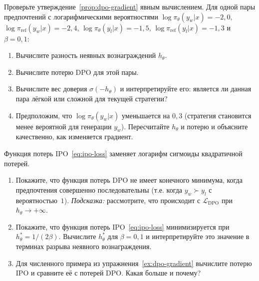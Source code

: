 \begin{exercise}
\label{ex:dpo-gradient}
Проверьте утверждение~\ref{prop:dpo-gradient} явным вычислением. Для одной пары предпочтений с логарифмическими вероятностями $\log\pi_\theta(y_w|x) = -2{,}0$, $\log\pi_\mathrm{ref}(y_w|x) = -2{,}4$, $\log\pi_\theta(y_l|x) = -1{,}5$, $\log\pi_\mathrm{ref}(y_l|x) = -1{,}3$ и $\beta = 0{,}1$:
\begin{enumerate}
  \item Вычислите разность неявных вознаграждений $h_\theta$.
  \item Вычислите потерю DPO для этой пары.
  \item Вычислите вес доверия $\sigma(-h_\theta)$ и интерпретируйте его: является ли данная пара лёгкой или сложной для текущей стратегии?
  \item Предположим, что $\log\pi_\theta(y_w|x)$ уменьшается на $0{,}3$ (стратегия становится менее вероятной для генерации $y_w$). Пересчитайте $h_\theta$ и потерю и объясните качественно, как изменяется градиент.
\end{enumerate}
\end{exercise}

\begin{exercise}
\label{ex:ipo-vs-dpo}
Функция потерь IPO~\eqref{eq:ipo-loss} заменяет логарифм сигмоиды квадратичной потерей.
\begin{enumerate}
  \item Покажите, что функция потерь DPO не имеет конечного минимума, когда предпочтения совершенно последовательны (т.е. когда $y_w \succ y_l$ с вероятностью~$1$). \emph{Подсказка:} рассмотрите, что происходит с $\mathcal{L}_\mathrm{DPO}$ при $h_\theta \to +\infty$.
  \item Покажите, что функция потерь IPO~\eqref{eq:ipo-loss} минимизируется при $h_\theta^* = 1/(2\beta)$. Вычислите $h_\theta^*$ для $\beta = 0{,}1$ и интерпретируйте это значение в терминах разрыва неявного вознаграждения.
  \item Для численного примера из упражнения~\ref{ex:dpo-gradient} вычислите потерю IPO и сравните её с потерей DPO. Какая больше и почему?
\end{enumerate}
\end{exercise}

